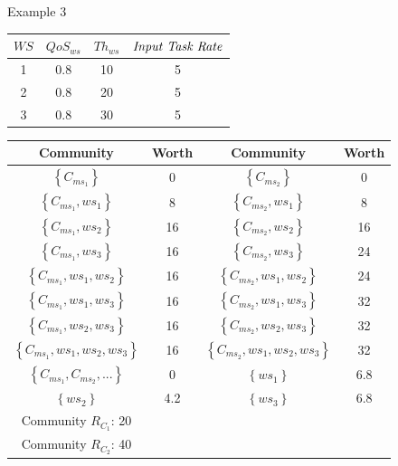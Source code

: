 \documentclass{beamer}
\begin{document}
\begin{frame}{Example 3}
    \begin{table}[!t]
    \renewcommand{\arraystretch}{0.8}
    \label{example_3}
    \centering
    \begin{tabular}{c c c c}
    \hline
    $WS$ & $QoS_{ws}$ & $Th_{ws}$ & $\text{\emph{Input Task Rate}}$\\
    \hline
    1 & 0.8 & 10 & 5\\
    2 & 0.8 & 20 & 5\\
    3 & 0.8 & 30 & 5\\
    \hline
    \end{tabular}
    \end{table}

    \begin{table}[!t]
    \renewcommand{\arraystretch}{0.8}
    \label{example_3_2}
    \centering
    \begin{tabular}{c c || c c}
    \hline
    Community & Worth & Community & Worth\\
    \hline
    $\left\{C_{ms_1}\right\}$ & 0 & $\left\{C_{ms_2}\right\}$ & 0\\
    $\left\{C_{ms_1}, ws_1\right\}$ & 8 & $\left\{C_{ms_2}, ws_1\right\}$ & 8\\
    $\left\{C_{ms_1}, ws_2\right\}$ & 16 & $\left\{C_{ms_2}, ws_2\right\}$ & 16\\
    $\left\{C_{ms_1}, ws_3\right\}$ & 16 & $\left\{C_{ms_2}, ws_3\right\}$ & 24\\
    $\left\{C_{ms_1}, ws_1, ws_2\right\}$ & 16 & $\left\{C_{ms_2}, ws_1, ws_2\right\}$ & 24\\
    $\left\{C_{ms_1}, ws_1, ws_3\right\}$ & 16 & $\left\{C_{ms_2}, ws_1, ws_3\right\}$ & 32\\
    $\left\{C_{ms_1}, ws_2, ws_3\right\}$ & 16 & $\left\{C_{ms_2}, ws_2, ws_3\right\}$ & 32\\
    $\left\{C_{ms_1}, ws_1, ws_2, ws_3\right\}$ & 16 & $\left\{C_{ms_2}, ws_1, ws_2, ws_3\right\}$ & 32\\
    $\left\{C_{ms_1}, C_{ms_2}, ...\right\}$ & 0 & $\left\{ws_1\right\}$ & 6.8\\
    $\left\{ws_2\right\}$ & 4.2 & $\left\{ws_3\right\}$ & 6.8\\
    \hline
    Community $R_{C_1}$: 20 \\ Community $R_{C_2}$: 40\\
    \hline
    \end{tabular}
    \end{table}
\end{frame}
\end{document}
